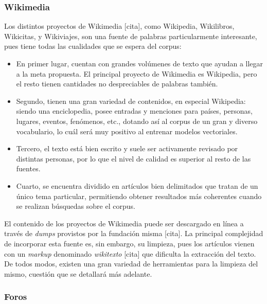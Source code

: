 \subsubsection{Wikimedia}

Los distintos proyectos de Wikimedia [cita], como Wikipedia, Wikilibros, Wikicitas, y Wikiviajes,
son una fuente de palabras particularmente interesante, pues tiene todas las cualidades que se
espera del corpus:

\begin{itemize}

\item En primer lugar, cuentan con grandes volúmenes de texto que ayudan a llegar a la meta
propuesta. El principal proyecto de Wikimedia es Wikipedia, pero el resto tienen cantidades no
despreciables de palabras también.

\item Segundo, tienen una gran variedad de contenidos, en especial Wikipedia: siendo una
enciclopedia, posee entradas y menciones para países, personas, lugares, eventos, fenómenos, etc.,
dotando así al corpus de un gran y diverso vocabulario, lo cuál será muy positivo al entrenar
modelos vectoriales.

\item Tercero, el texto está bien escrito y suele ser activamente revisado por distintas personas,
por lo que el nivel de calidad es superior al resto de las fuentes.

\item Cuarto, se encuentra dividido en artículos bien delimitados que tratan de un único tema
particular, permitiendo obtener resultados más coherentes cuando se realizan búsquedas sobre el
corpus.

\end{itemize}


El contenido de los proyectos de Wikimedia puede ser descargado en línea a través de \textit{dumps}
provistos por la fundación misma [cita]. La principal complejidad de incorporar esta fuente es, sin
embargo, su limpieza, pues los artículos vienen con un \textit{markup} denominado \textit{wikitexto}
[cita] que dificulta la extracción del texto. De todos modos, existen una gran variedad de
herramientas para la limpieza del mismo, cuestión que se detallará más adelante.


\subsubsection{Foros}

